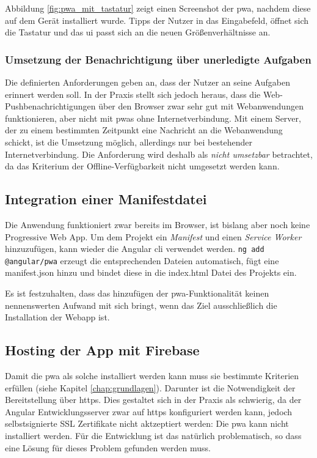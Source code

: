 Abbildung \ref{fig:pwa_mit_tastatur} zeigt einen Screenshot der \ac{pwa}, nachdem diese auf dem Gerät installiert wurde. Tipps der Nutzer in das Eingabefeld, öffnet sich die Tastatur und das \ac{ui} passt sich an die neuen Größenverhältnisse an.
\subsubsection{Umsetzung der Benachrichtigung über unerledigte Aufgaben}
Die definierten Anforderungen geben an, dass der Nutzer an seine Aufgaben erinnert werden soll. In der Praxis stellt sich jedoch heraus, dass die Web-Pushbenachrichtigungen über den Browser zwar sehr gut mit Webanwendungen funktionieren, aber nicht mit \ac{pwa}s ohne Internetverbindung. Mit einem Server, der zu einem bestimmten Zeitpunkt eine Nachricht an die Webanwendung schickt, ist die Umsetzung möglich, allerdings nur bei bestehender Internetverbindung. Die Anforderung wird deshalb als \textit{nicht umsetzbar} betrachtet, da das Kriterium der Offline-Verfügbarkeit nicht umgesetzt werden kann.



\subsection{Integration einer Manifestdatei}

Die Anwendung funktioniert zwar bereits im Browser, ist bislang aber noch keine Progressive Web App. Um dem Projekt ein \textit{Manifest} und einen \textit{Service Worker} hinzuzufügen, kann wieder die Angular \ac{cli} verwendet werden. \texttt{ng add @angular/pwa} erzeugt die entsprechenden Dateien automatisch, fügt eine manifest.json hinzu und bindet diese in die index.html Datei des Projekts ein.

Es ist festzuhalten, dass das hinzufügen der \ac{pwa}-Funktionalität keinen nennenswerten Aufwand mit sich bringt, wenn das Ziel ausschließlich die Installation der Webapp ist.

\subsection{Hosting der App mit Firebase}
Damit die \ac{pwa} als solche installiert werden kann muss sie bestimmte Kriterien erfüllen (siehe Kapitel \ref{chap:grundlagen}). Darunter ist die Notwendigkeit der Bereitstellung über \ac{https}. Dies gestaltet sich in der Praxis als schwierig, da der Angular Entwicklungsserver zwar auf \ac{https} konfiguriert werden kann, jedoch selbstsignierte SSL Zertifikate nicht aktzeptiert werden: Die \ac{pwa} kann nicht installiert werden. Für die Entwicklung ist das natürlich problematisch, so dass eine Lösung für dieses Problem gefunden werden muss.

